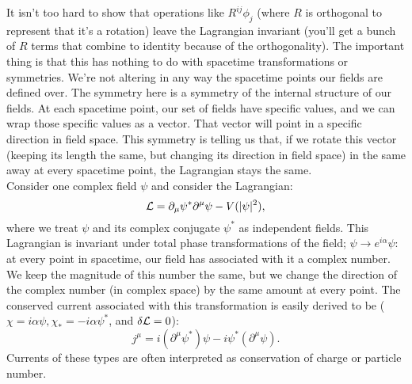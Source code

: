 It isn't too hard to show that operations like $R^{ij}\phi_j$ (where $R$ is orthogonal to represent that it's a rotation) leave the Lagrangian invariant (you'll get a bunch of $R$ terms that combine to identity because of the orthogonality). The important thing is that this has nothing to do with spacetime transformations or symmetries. We're not altering in any way the spacetime points our fields are defined over. The symmetry here is a symmetry of the internal structure of our fields. At each spacetime point, our set of fields have specific values, and we can wrap those specific values as a vector. That vector will point in a specific direction in field space. This symmetry is telling us that, if we rotate this vector (keeping its length the same, but changing its direction in field space) in the same away at every spacetime point, the Lagrangian stays the same. \\

\noindent Consider one complex field $\psi$ and consider the Lagrangian: 
\[
    \mathcal{L} =\partial_\mu\psi^*\partial^\mu\psi - V(|\psi|^2),
\]
where we treat $\psi$ and its complex conjugate $\psi^*$ as independent fields. This Lagrangian is invariant under total phase transformations of the field; $\psi\rightarrow e^{i\alpha}\psi$: at every point in spacetime, our field has associated with it a complex number. We keep the magnitude of this number the same, but we change the direction of the complex number (in complex space) by the same amount at every point. The conserved current associated with this transformation is easily derived to be ($\chi = i\alpha\psi, \chi_*=-i\alpha\psi^*$, and $\delta\mathcal{L}=0$):
\[
    j^\mu = i(\partial^\mu\psi^*)\psi - i\psi^*(\partial^\mu\psi).
\]
Currents of these types are often interpreted as conservation of charge or particle number.

